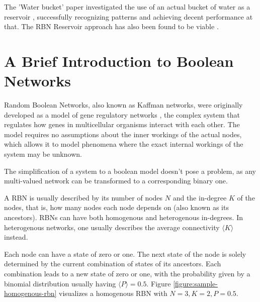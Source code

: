 The 'Water bucket' paper investigated the use of an actual bucket of water as a reservoir \cite{fernando2003pattern},
successfully recognizing patterns and achieving decent performance at that.
The RBN Reservoir approach has also been found to be viable \cite{rbn-reservoir} .

\section{A Brief Introduction to Boolean Networks}
\label{section:rbns}

Random Boolean Networks, also known as Kaffman networks,
were originally developed as a model of gene regulatory networks \cite{kauffman1969metabolic},
the complex system that regulates how genes in multicellular organisms interact with each other.
The model requires no assumptions about the inner workings of the actual nodes,
which allows it to model phenomena where the exact internal workings of the system may be unknown.

The simplification of a system to a boolean model doesn't pose a problem,
as any multi-valued network can be transformed to a corresponding binary one.

A RBN is usually described by its number of nodes $N$ and the in-degree $K$ of the nodes,
that is, how many nodes each node depends on (also known as its ancestors).
RBNs can have both homogenous and heterogenous in-degrees.
In heterogenous networks, one usually describes the average connectivity $\langle K \rangle$ instead.

Each node can have a state of zero or one.
The next state of the node is solely determined by the current combination of states of its ancestors.
Each combination leads to a new state of zero or one,
with the probability given by a binomial distribution usually having $\langle P \rangle = 0.5$.
Figure \ref{figure:sample-homogenous-rbn} visualizes a homogenous RBN with $N=3, K=2, P=0.5$.

